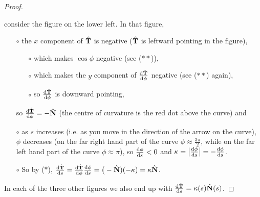 \begin{proof}
{\begin{efig}
\begin{center}
\end{center}
\end{efig}
}
consider the figure on the lower left. In that figure,
\begin{itemize}\itemsep1pt \parskip0pt  %
\item[$\circ$] 
the $x$ component of $\hat{\mathbf{T}}$ is negative ($\hat{\mathbf{T}}$ is leftward pointing in the figure),
\begin{itemize}\itemsep1pt \parskip0pt  %
\item[$\circ$] 
which makes $\cos\phi$ negative (see ($**$)), 
\item[$\circ$] 
which makes the $y$ component of $\diff{\hat\vT}{\phi}$ negative
            (see ($**$) again),
\item[$\circ$] 
so $\diff{\hat\vT}{\phi}$ is downward pointing,
\end{itemize}
so $\diff{\hat\vT}{\phi}=-\hat\vN$ (the centre of curvature is the red dot 
above the curve) and
\item[$\circ$] as $s$ increases (i.e. as you move in the direction of the
arrow on the curve), $\phi$ decreases (on the far right hand part of the curve $\phi\approx\frac{3\pi}{2}$, while on the far left hand part of the curve $\phi\approx\pi$), so $\diff{\phi}{s}<0$ and
$\ka = \big|\diff{\phi}{s}\big| = - \diff{\phi}{s}$.
\item[$\circ$] So by ($*$),
$\diff{\hat\vT}{s} = \diff{\hat\vT}{\phi} \diff{\phi}{s}
=\big(-\hat\vN)(-\ka) = \ka\hat\vN$.
\end{itemize}
In each of the three other figures we also end up with 
$\diff{\hat\vT}{s} = \ka(s)\hat\vN(s)$.
\end{proof}
